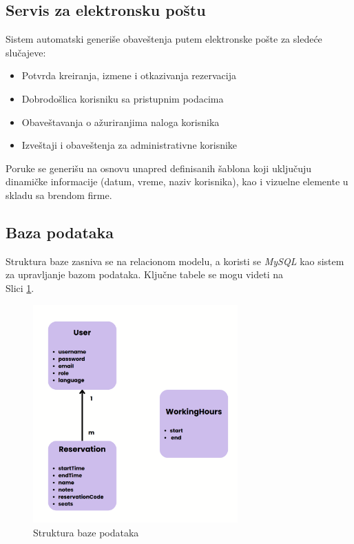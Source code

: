 \documentclass[12pt]{article}
\begin{document}
    \subsection{Servis za elektronsku poštu}

    Sistem automatski generiše obaveštenja putem elektronske pošte za sledeće slučajeve:
    \begin{itemize}
    \item Potvrda kreiranja, izmene i otkazivanja rezervacija
    \item Dobrodošlica korisniku sa pristupnim podacima
    \item Obaveštavanja o ažuriranjima naloga korisnika
    \item Izveštaji i obaveštenja za administrativne korisnike
    \end{itemize}

    Poruke se generišu na osnovu unapred definisanih šablona koji uključuju dinamičke 
    informacije (datum, vreme, naziv korisnika), kao i vizuelne elemente u skladu sa brendom firme.

    \newpage
    \subsection{Baza podataka}

    Struktura baze zasniva se na relacionom modelu, a koristi se \textit{MySQL} kao sistem za upravljanje 
    bazom podataka. Ključne tabele se mogu videti na \\ Slici \ref{fig:baza_struktura}.

    \begin{figure}[h!]
        \vspace{0.5cm}
        \centering
        \includegraphics[width=0.7\textwidth]{db.png}
        \caption{Struktura baze podataka}
        \label{fig:baza_struktura}
    \end{figure}
\end{document}
